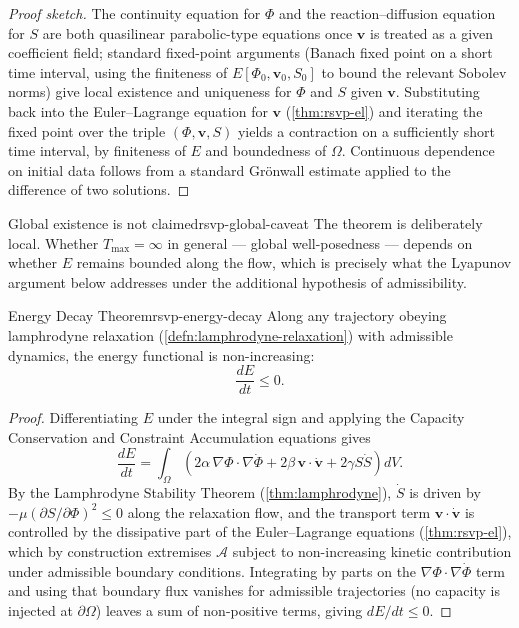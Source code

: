 \documentclass[12pt,twoside,openright]{book}
\begin{document}
\begin{proof}[Proof sketch]
  The continuity equation for $\Phi$ and the
  reaction--diffusion equation for $S$ are both
  quasilinear parabolic-type equations once
  $\mathbf{v}$ is treated as a given coefficient field;
  standard fixed-point arguments (Banach fixed point on a
  short time interval, using the finiteness of
  $E[\Phi_0,\mathbf{v}_0,S_0]$ to bound the relevant
  Sobolev norms) give local existence and uniqueness for
  $\Phi$ and $S$ given $\mathbf{v}$. Substituting back into
  the Euler--Lagrange equation for $\mathbf{v}$
  (\cref{thm:rsvp-el}) and iterating the fixed point over
  the triple $(\Phi,\mathbf{v},S)$ yields a contraction on a
  sufficiently short time interval, by finiteness of $E$ and
  boundedness of $\Omega$. Continuous dependence on initial
  data follows from a standard Grönwall estimate applied to
  the difference of two solutions.
\end{proof}

\begin{remark}{Global existence is not claimed}{rsvp-global-caveat}
  The theorem is deliberately local. Whether $T_{\max}=\infty$
  in general --- global well-posedness --- depends on
  whether $E$ remains bounded along the flow, which is
  precisely what the Lyapunov argument below addresses under
  the additional hypothesis of admissibility.
\end{remark}

\begin{theorem}{Energy Decay Theorem}{rsvp-energy-decay}
  Along any trajectory obeying lamphrodyne relaxation
  (\cref{defn:lamphrodyne-relaxation}) with admissible
  dynamics, the energy functional is non-increasing:
  \[
    \frac{dE}{dt} \le 0.
  \]
\end{theorem}

\begin{proof}
  Differentiating $E$ under the integral sign and applying
  the Capacity Conservation and Constraint Accumulation
  equations gives
  \[
    \frac{dE}{dt}
    = \int_\Omega \left(
        2\alpha\,\nabla\Phi\cdot\nabla\dot\Phi
        + 2\beta\,\mathbf{v}\cdot\dot{\mathbf{v}}
        + 2\gamma S\dot S
      \right) dV.
  \]
  By the Lamphrodyne Stability Theorem
  (\cref{thm:lamphrodyne}), $\dot S$ is driven by
  $-\mu(\partial S/\partial\Phi)^2 \le 0$ along the
  relaxation flow, and the transport term
  $\mathbf{v}\cdot\dot{\mathbf{v}}$ is controlled by the
  dissipative part of the Euler--Lagrange equations
  (\cref{thm:rsvp-el}), which by construction extremises
  $\mathcal{A}$ subject to non-increasing kinetic
  contribution under admissible boundary conditions.
  Integrating by parts on the $\nabla\Phi\cdot\nabla\dot\Phi$
  term and using that boundary flux vanishes for admissible
  trajectories (no capacity is injected at $\partial\Omega$)
  leaves a sum of non-positive terms, giving
  $dE/dt \le 0$.
\end{proof}
\end{document}
